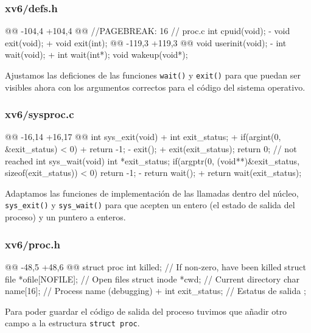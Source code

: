 \subsubsection{xv6/defs.h}
\begin{listing}
@@ -104,4 +104,4 @@
//PAGEBREAK: 16
// proc.c
    int             cpuid(void);
-   void            exit(void);
+   void            exit(int);
@@ -119,3 +119,3 @@
    void            userinit(void);
-   int             wait(void);
+   int             wait(int*);
    void            wakeup(void*);
\end{listing}
\par Ajustamos las deficiones de las funciones \texttt{wait()} y \texttt{exit()}
para que puedan ser visibles ahora con los argumentos correctos para el código del sistema operativo.
\newpage
\subsubsection{xv6/sysproc.c}
\begin{listing}
@@ -16,14 +16,17 @@
    int
    sys_exit(void)
    {
+       int exit_status;
+       if(argint(0, &exit_status) < 0)
+           return -1;
-       exit();
+       exit(exit_status);
        return 0;  // not reached
    }
    int
    sys_wait(void)
    {
        int *exit_status;
        if(argptr(0, (void**)&exit_status, sizeof(exit_status)) < 0)
            return -1;
-       return wait();
+       return wait(exit_status);
    }
\end{listing}
\par Adaptamos las funciones de implementación de las llamadas dentro del núcleo, \\
\texttt{sys\_exit()} y \texttt{sys\_wait()} para que acepten un entero (el estado 
de salida del proceso) y un puntero a enteros.

\subsubsection{xv6/proc.h}
\begin{listing}
@@ -48,5 +48,6 @@ struct proc {
        int killed;                  // If non-zero, have been killed
        struct file *ofile[NOFILE];  // Open files
        struct inode *cwd;           // Current directory
        char name[16];               // Process name (debugging)
+       int exit_status;             // Estatus de salida
    };
\end{listing}
\par Para poder guardar el código de salida del proceso tuvimos que añadir otro campo a la estructura \texttt{struct proc}.

